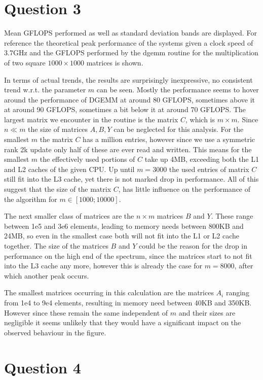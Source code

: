 \documentclass{scrartcl}
\begin{document}
\section{Question 3}


Mean GFLOPS performed as well as standard deviation bands are displayed. 
For reference the theoretical peak performance of the systems given a clock speed of $3.7$GHz and the GFLOPS performed by the dgemm routine for the multiplication of two square $1000 \times 1000$ matrices is shown.

In terms of actual trends, the results are surprisingly inexpressive, no consistent trend w.r.t. the parameter $m$ can be seen.
Mostly the performance seems to hover around the performance of DGEMM at around 80 GFLOPS, sometimes above it at around 90 GFLOPS, sometimes a bit below it at around 70 GFLOPS.
The largest matrix we encounter in the routine is the matrix $C$, which is $m \times m$.
Since $n \ll m$ the size of matrices $A,B,Y$ can be neglected for this analysis.
For the smallest $m$ the matrix $C$ has a million entries, however since we use a symmetric rank 2k update only half of these are ever read and written.
This means for the smallest $m$ the effectively used portions of $C$ take up 4MB, exceeding both the L1 and L2 caches of the given CPU.
Up until $m=3000$ the used entries of matrix $C$ still fit into the L3 cache, yet there is not marked drop in performance.
All of this suggest that the size of the matrix $C$, has little influence on the performance of the algorithm for $m \in [1000;10000]$.

The next smaller class of matrices are the $n \times m$ matrices $B$ and $Y$.
These range between 1e5 and 3e6 elements, leading to memory needs between 800KB and 24MB, so even in the smallest case both will not fit into the L1 or L2 cache together.
The size of the matrices $B$ and $Y$ could be the reason for the drop in performance on the high end of the spectrum, since the matrices start to not fit into the L3 cache any more, however this is already the case for $m=8000$, after which another peak occurs.

The smallest matrices occurring in this calculation are the matrices $A_i$ ranging from 1e4 to 9e4 elements, resulting in memory need between 40KB and 350KB.
However since these remain the same independent of $m$ and their sizes are negligible it seems unlikely that they would have a significant impact on the observed behaviour in the figure.

\section{Question 4}
\end{document}
